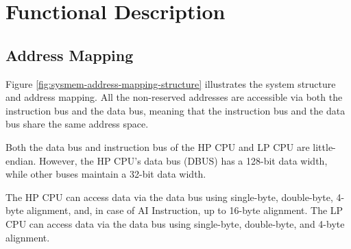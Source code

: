 \documentclass[main\_\_EN.tex]{subfiles}
\begin{document}
\section{Functional Description}

\subsection{Address Mapping}
Figure \ref{fig:sysmem-address-mapping-structure} illustrates the system structure and address mapping. All the non-reserved addresses are accessible via both the instruction bus and the data bus, meaning that the instruction bus and the data bus share the same address space.

Both the data bus and instruction bus of the HP CPU and LP CPU are little-endian. However, the HP CPU's data bus (DBUS) has a 128-bit data width, while other buses maintain a 32-bit data width.

The HP CPU can access data via the data bus using single-byte, double-byte, 4-byte alignment, and, in case of AI Instruction, up to 16-byte alignment. The LP CPU can access data via the data bus using single-byte, double-byte, and 4-byte alignment.
\end{document}
